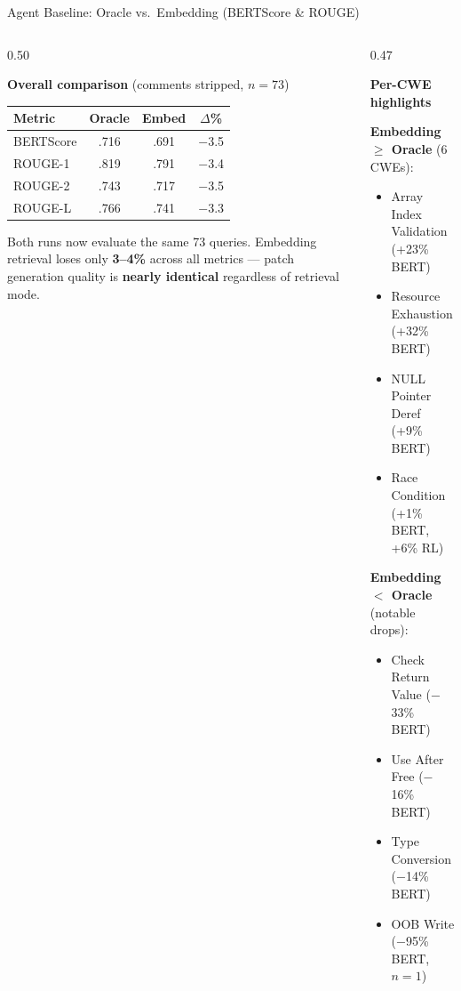 \documentclass[aspectratio=169,10pt]{beamer}
\newcommand{\cmiss}[1]{\cellcolor{miss!25} #1}
\begin{document}
\begin{frame}{Agent Baseline: Oracle vs.\ Embedding (BERTScore \& ROUGE)}
\begin{columns}[T]
\begin{column}{0.50\textwidth}

  \textbf{Overall comparison} {\small(comments stripped, $n{=}73$)}

  \vspace{0.4em}
  {\scriptsize
  \renewcommand{\arraystretch}{1.35}
  \begin{tabular}{l c c c}
    \toprule
    \textbf{Metric}
      & \textbf{Oracle}
      & \textbf{Embed}
      & \textbf{$\Delta$\%} \\
    \midrule
    BERTScore   & .716 & .691 & \cmiss{$-$3.5} \\
    ROUGE-1     & .819 & .791 & \cmiss{$-$3.4} \\
    ROUGE-2     & .743 & .717 & \cmiss{$-$3.5} \\
    ROUGE-L     & .766 & .741 & \cmiss{$-$3.3} \\
    \bottomrule
  \end{tabular}}

  \vspace{0.6em}
  {\scriptsize\textcolor{c1}{}
  Both runs now evaluate the same 73 queries.
  Embedding retrieval loses only \textbf{3--4\%} across all metrics ---
  patch generation quality is \textbf{nearly identical}
  regardless of retrieval mode.}

\end{column}
\begin{column}{0.47\textwidth}

  \textbf{Per-CWE highlights}

  \vspace{0.4em}
  {\scriptsize
  \textcolor{hit}{} \textbf{Embedding $\ge$ Oracle} (6 CWEs):
  \begin{itemize}\setlength{\itemsep}{1pt}
    \item Array Index Validation (+23\% BERT)
    \item Resource Exhaustion (+32\% BERT)
    \item NULL Pointer Deref (+9\% BERT)
    \item Race Condition (+1\% BERT, +6\% RL)
  \end{itemize}}

  \vspace{0.4em}
  {\scriptsize
  \textcolor{miss}{} \textbf{Embedding $<$ Oracle} (notable drops):
  \begin{itemize}\setlength{\itemsep}{1pt}
    \item Check Return Value ($-$33\% BERT)
    \item Use After Free ($-$16\% BERT)
    \item Type Conversion ($-$14\% BERT)
    \item OOB Write ($-$95\% BERT, $n{=}1$)
  \end{itemize}}


\end{column}
\end{columns}
\end{frame}
\end{document}
